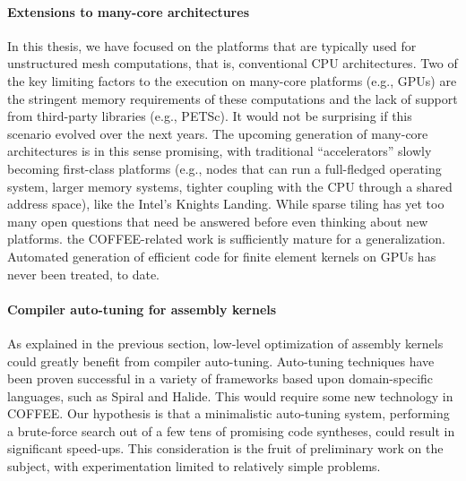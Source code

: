 \paragraph{Extensions to many-core architectures}
In this thesis, we have focused on the platforms that are typically used for unstructured mesh computations, that is, conventional CPU architectures. Two of the key limiting factors to the execution on many-core platforms (e.g., GPUs) are the stringent memory requirements of these computations and the lack of support from third-party libraries (e.g., PETSc). It would not be surprising if this scenario evolved over the next years. The upcoming generation of many-core architectures is in this sense promising, with traditional ``accelerators'' slowly becoming first-class platforms (e.g., nodes that can run a full-fledged operating system, larger memory systems, tighter coupling with the CPU through a shared address space), like the Intel's Knights Landing. While sparse tiling has yet too many open questions that need be answered before even thinking about new platforms. the COFFEE-related work is sufficiently mature for a generalization. Automated generation of efficient code for finite element kernels on GPUs has never been treated, to date.

\paragraph{Compiler auto-tuning for assembly kernels}
As explained in the previous section, low-level optimization of assembly kernels could greatly benefit from compiler auto-tuning. Auto-tuning techniques have been proven successful in a variety of frameworks based upon domain-specific languages, such as Spiral and Halide. This would require some new technology in COFFEE. Our hypothesis is that a minimalistic auto-tuning system, performing a brute-force search out of a few tens of promising code syntheses, could result in significant speed-ups. This consideration is the fruit of preliminary work on the subject, with experimentation limited to relatively simple problems.

